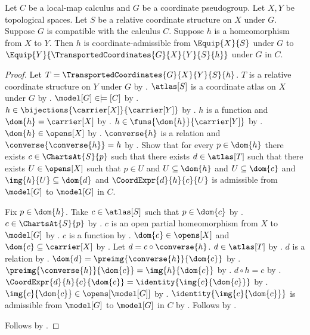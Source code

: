 \begin{theorem}\label{transported_coordinates_admissible}
    Let $C$ be a local-map calculus and $G$ be a coordinate pseudogroup.
    Let $X,Y$ be topological spaces.
    Let $S$ be a relative coordinate structure on $X$ under $G$.
    Suppose $G$ is compatible with the calculus $C$.
    Suppose $h$ is a homeomorphism from $X$ to $Y$.
    Then $h$ is coordinate-admissible from $\Equip{X}{S}$ under $G$
        to $\Equip{Y}{\TransportedCoordinates{G}{X}{Y}{S}{h}}$ under $G$ in $C$.
\end{theorem}
\begin{proof}
    Let $T=\TransportedCoordinates{G}{X}{Y}{S}{h}$.
    $T$ is a relative coordinate structure on $Y$ under $G$ by .
    $\atlas[S]$ is a coordinate atlas on $X$ under $G$ by
        .
    $\model[G]\in\models[C]$ by .
    $h\in\bijections{\carrier[X]}{\carrier[Y]}$ by .
    $h$ is a function and $\dom{h}=\carrier[X]$ by .
    $h\in\funs{\dom{h}}{\carrier[Y]}$ by .
    $\dom{h}\in\opens[X]$ by .
    $\converse{h}$ is a relation and $\converse{\converse{h}}=h$ by
        .
    Show that for every $p\in\dom{h}$ there exists $c\in\ChartsAt{S}{p}$ such that
        there exists $d\in\atlas[T]$ such that there exists $U\in\opens[X]$ such that
            $p\in U$ and $U\subseteq\dom{h}$ and $U\subseteq\dom{c}$ and
            $\img{h}{U}\subseteq\dom{d}$ and
            $\CoordExpr{d}{h}{c}{U}$ is admissible from $\model[G]$ to $\model[G]$ in $C$.
    \begin{subproof}
        Fix $p\in\dom{h}$.
        Take $c\in\atlas[S]$ such that $p\in\dom{c}$ by .
        $c\in\ChartsAt{S}{p}$ by .
        $c$ is an open partial homeomorphism from $X$ to $\model[G]$ by .
        $c$ is a function by .
        $\dom{c}\in\opens[X]$ and $\dom{c}\subseteq\carrier[X]$ by
            .
        Let $d=c\circ\converse{h}$.
        $d\in\atlas[T]$ by .
        $d$ is a relation by .
        $\dom{d}=\preimg{\converse{h}}{\dom{c}}$ by .
        $\preimg{\converse{h}}{\dom{c}}=\img{h}{\dom{c}}$ by .
        $d\circ h=c$ by .
        $\CoordExpr{d}{h}{c}{\dom{c}}=\identity{\img{c}{\dom{c}}}$ by
            .
        $\img{c}{\dom{c}}\in\opens[\model[G]]$ by .
        $\identity{\img{c}{\dom{c}}}$ is admissible from $\model[G]$ to $\model[G]$ in $C$ by
            .
        Follows by .
    \end{subproof}
    Follows by .
\end{proof}

